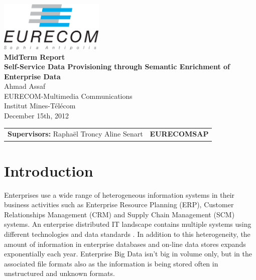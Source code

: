\documentclass[onecolumn, crcready]{iosart2c}
\begin{document}
\begin{center}
\includegraphics[width=5cm]{EURECOM_logo_quadri}
\\[3cm]
\textbf{\Huge{MidTerm Report}}
\\[4cm]
\textbf{\LARGE{Self-Service Data Provisioning through Semantic Enrichment of Enterprise Data}}
\\[0.5cm]
\LARGE{Ahmad Assaf}
\\[0.5cm]
\small{EURECOM-Multimedia Communications}
\\
\large{Institut Mines-T\'{e}l\'{e}com}
\\
\large{December 15th, 2012}
\\[5cm]
\begin{tabular}{p{8cm} p{8.5cm}}
\small{\textbf{Supervisors:}\newline
Rapha\"el Troncy \newline Aline Senart} 
&
\small{\textbf{\newline EURECOM\newline SAP}}
\end{tabular}
\end{center}


\section{Introduction}
Enterprises use a wide range of heterogeneous information systems in their business activities such as Enterprise Resource Planning (ERP), Customer Relationships Management (CRM) and Supply Chain Management (SCM) systems. An enterprise distributed IT landscape contains multiple systems using different technologies and data standards \cite{DBLP:conf/semweb/MihindukulasooriyaGG13}. In addition to this heterogeneity, the amount of information in enterprise databases and on-line data stores expands exponentially each year. Enterprise Big Data isn't big in volume only, but in the associated file formats also as the information is being stored often in unstructured and unknown formats.\\
\end{document}
